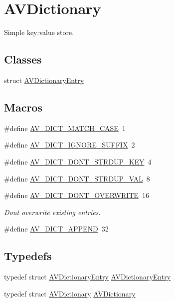 \hypertarget{group__lavu__dict}{}\section{A\+V\+Dictionary}
\label{group__lavu__dict}


Simple key\+:value store.  


\subsection*{Classes}
\begin{DoxyCompactItemize}
\item 
struct \hyperlink{struct_a_v_dictionary_entry}{A\+V\+Dictionary\+Entry}
\end{DoxyCompactItemize}
\subsection*{Macros}
\begin{DoxyCompactItemize}
\item 
\#define \hyperlink{group__lavu__dict_gad9cbc53cec515b72ae7caa2e194c6bc0}{A\+V\+\_\+\+D\+I\+C\+T\+\_\+\+M\+A\+T\+C\+H\+\_\+\+C\+A\+SE}~1
\item 
\#define \hyperlink{group__lavu__dict_ga341bbd1ea599dfb0510f419e5272fecc}{A\+V\+\_\+\+D\+I\+C\+T\+\_\+\+I\+G\+N\+O\+R\+E\+\_\+\+S\+U\+F\+F\+IX}~2
\item 
\#define \hyperlink{group__lavu__dict_gacb0ce4f20c15bf174f93590ace0fc8fd}{A\+V\+\_\+\+D\+I\+C\+T\+\_\+\+D\+O\+N\+T\+\_\+\+S\+T\+R\+D\+U\+P\+\_\+\+K\+EY}~4
\item 
\#define \hyperlink{group__lavu__dict_ga7a9a991cb7837b10ffd44725263de425}{A\+V\+\_\+\+D\+I\+C\+T\+\_\+\+D\+O\+N\+T\+\_\+\+S\+T\+R\+D\+U\+P\+\_\+\+V\+AL}~8
\item 
\#define \hyperlink{group__lavu__dict_ga8ed4237acfc3d68484301a5d1859936c}{A\+V\+\_\+\+D\+I\+C\+T\+\_\+\+D\+O\+N\+T\+\_\+\+O\+V\+E\+R\+W\+R\+I\+TE}~16
\begin{DoxyCompactList}\small\item\em Don\textquotesingle{}t overwrite existing entries. \end{DoxyCompactList}\item 
\#define \hyperlink{group__lavu__dict_ga64018c01d1e8c44d1d8c03dfb099f2c2}{A\+V\+\_\+\+D\+I\+C\+T\+\_\+\+A\+P\+P\+E\+ND}~32
\end{DoxyCompactItemize}
\subsection*{Typedefs}
\begin{DoxyCompactItemize}
\item 
typedef struct \hyperlink{struct_a_v_dictionary_entry}{A\+V\+Dictionary\+Entry} \hyperlink{group__lavu__dict_gabd3d99365f54396328c265f9e5753f5c}{A\+V\+Dictionary\+Entry}
\item 
typedef struct \hyperlink{group__lavu__dict_ga1d7cc0833bee918994a600556410315f}{A\+V\+Dictionary} \hyperlink{group__lavu__dict_ga1d7cc0833bee918994a600556410315f}{A\+V\+Dictionary}
\end{DoxyCompactItemize}
